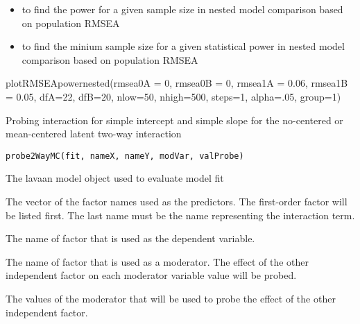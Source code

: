 \documentclass[a4paper]{book}
\begin{document}
%
\begin{SeeAlso}\relax
\begin{itemize}

\item {} to find the power for a given sample size in nested model comparison based on population RMSEA
\item {} to find the minium sample size for a given statistical power in nested model comparison based on population RMSEA

\end{itemize}

\end{SeeAlso}
%
\begin{Examples}
\begin{ExampleCode}
plotRMSEApowernested(rmsea0A = 0, rmsea0B = 0, rmsea1A = 0.06, rmsea1B = 0.05, 
dfA=22, dfB=20, nlow=50, nhigh=500, steps=1, alpha=.05, group=1)  
\end{ExampleCode}
\end{Examples}
%
\begin{Description}\relax
Probing interaction for simple intercept and simple slope for the no-centered or mean-centered latent two-way interaction
\end{Description}
%
\begin{Usage}
\begin{verbatim}
probe2WayMC(fit, nameX, nameY, modVar, valProbe)
\end{verbatim}
\end{Usage}
%
\begin{Arguments}
\begin{ldescription}
\item[\code{fit}] The lavaan model object used to evaluate model fit
\item[\code{nameX}] The vector of the factor names used as the predictors. The first-order factor will be listed first. The last name must be the name representing the interaction term.
\item[\code{nameY}] The name of factor that is used as the dependent variable.
\item[\code{modVar}] The name of factor that is used as a moderator. The effect of the other independent factor on each moderator variable value will be probed.
\item[\code{valProbe}] The values of the moderator that will be used to probe the effect of the other independent factor.
\end{ldescription}
\end{Arguments}
\end{document}
